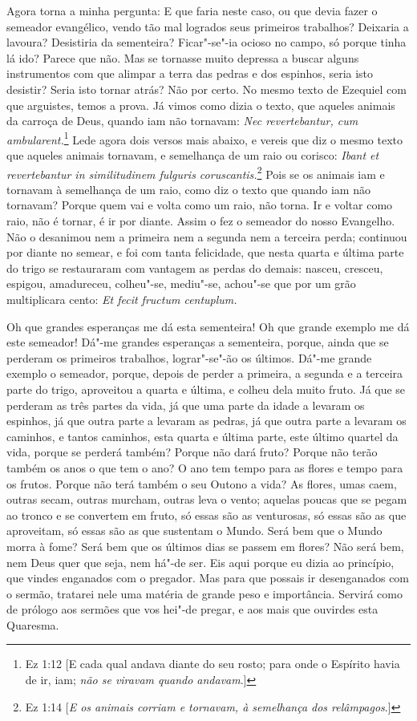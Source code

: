 Agora torna a minha pergunta: E que faria neste caso, ou que devia fazer
o semeador evangélico, vendo tão mal logrados seus primeiros trabalhos?
Deixaria a lavoura? Desistiria da sementeira? Ficar"-se"-ia ocioso no
campo, só porque tinha lá ido? Parece que não. Mas se tornasse muito
depressa a buscar alguns instrumentos com que alimpar a terra das
pedras e dos espinhos, seria isto desistir? Seria isto tornar atrás?
Não por certo. No mesmo texto de Ezequiel com que arguistes, temos a
prova. Já vimos como dizia o texto, que aqueles animais da carroça de
Deus, quando iam não tornavam: \emph{Nec revertebantur, cum
ambularent.}\footnote{Ez 1:12 [E cada qual andava diante do seu rosto; para onde o Espírito havia de ir, iam; \textit{não se viravam quando andavam}.]} Lede agora dois versos mais abaixo, e vereis que diz o
mesmo texto que aqueles animais tornavam, e semelhança de um raio ou
corisco: \emph{Ibant et revertebantur in similitudinem fulguris
coruscantis.}\footnote{Ez 1:14 [\textit{E os animais corriam e tornavam, à semelhança dos relâmpagos}.]} Pois se os animais iam e tornavam à semelhança de um raio,
como diz o texto que quando iam não tornavam? Porque quem vai e volta
como um raio, não torna. Ir e voltar como raio, não é tornar, é ir por
diante. Assim o fez o semeador do nosso Evangelho. Não o desanimou nem a
primeira nem a segunda nem a terceira perda; continuou por diante no
semear, e foi com tanta felicidade, que nesta quarta e última parte do
trigo se restauraram com vantagem as perdas do demais: nasceu,
cresceu, espigou, amadureceu, colheu"-se, mediu"-se, achou"-se que por um
grão multiplicara cento: \emph{Et fecit fructum centuplum.}

Oh que grandes esperanças me dá esta sementeira! Oh que
grande exemplo me dá este semeador! Dá"-me grandes esperanças a
sementeira, porque, ainda que se perderam os primeiros trabalhos,
lograr"-se"-ão os últimos. Dá"-me grande exemplo o semeador, porque, depois
de perder a primeira, a segunda e a terceira parte do trigo, aproveitou
a quarta e última, e colheu dela muito fruto. Já que se perderam as três
partes da vida, já que uma parte da idade a levaram os espinhos, já que
outra parte a levaram as pedras, já que outra parte a levaram os
caminhos, e tantos caminhos, esta quarta e última parte, este último
quartel da vida, porque se perderá também? Porque não dará fruto?
Porque não terão também os anos o que tem o ano? O ano tem tempo para as
flores e tempo para os
frutos. Porque não terá também o seu Outono a vida? As flores, umas
caem, outras secam, outras murcham, outras leva o vento; aquelas poucas
que se pegam ao tronco e se convertem em fruto, só essas são as
venturosas, só essas são as que aproveitam, só essas são as que
sustentam o Mundo. Será bem que o Mundo morra à fome? Será bem que os
últimos dias se passem em flores? Não será bem, nem Deus quer que
seja, nem há"-de ser. Eis aqui porque eu dizia ao princípio, que vindes
enganados com o pregador. Mas para que possais ir desenganados com o
sermão, tratarei nele uma matéria de grande peso e importância. Servirá
como de prólogo aos sermões que vos hei"-de pregar, e aos mais que
ouvirdes esta Quaresma.

